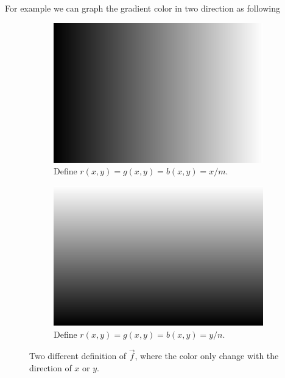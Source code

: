\documentclass[a4paper, reprint, showkeys, nofootinbib,twoside]{revtex4-1}
\begin{document}
		For example we can graph the gradient color in two direction as following
		\begin{figure}[h]\centering
			\begin{subfigure}{0.4\linewidth}\centering
				\includegraphics[width=\textwidth]{img/gradient-x.png}
				\caption{Define $r(x,y) = g(x,y)=b(x,y) = x/m$.}\label{fig:sub1}
			\end{subfigure}
			\hspace{0.05\linewidth}
			\begin{subfigure}{0.4\linewidth}\centering
				\includegraphics[width=\textwidth]{img/gradient-y.png}
				\caption{Define $r(x,y) = g(x,y)=b(x,y) = y/n$.}\label{fig:sub2}
			\end{subfigure}
			\caption{Two different definition of $\vec{f}$, where the color only change with the direction of $x$ or $y$.}\label{fig:test}
		\end{figure}
	
\end{document}
